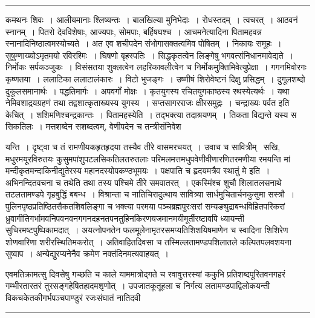 \documentclass[11pt, openany]{book}
\begin{document}
\vspace{2mm}
\hrule

\noindent
{\s कमथनः शिवः~। आलीयमानाः श्लिष्यन्तः~। बालखिल्या मुनिभेदाः~। रोधस्तदम्~। त्वचरत्~। आठवनं स्नानम्~। पितरो देवविशेषाः, आज्यपाः, सोमपाः, बर्हिषघश्च~। आचमनेत्यादिना पितामहवन्न स्नानादिनिष्ठात्वमस्योच्यते~। अत एव शचीपदेन संभोगासक्तत्वमिव पोषितम्~। निकायः समूहः~। सुषुम्णाख्योऽमृतमयो रविरश्मिः~। घिषणो बृहस्पतिः~। सिद्धकृतत्वेन लिङ्गेषु भगवत्संनिधानमावेद्यते~। निर्मोकः सर्पकञ्जुकः~। विसंसतया शुक्लत्वेन लहरिकावलीत्वेन च निर्मोकमुक्तिमिवेत्युप्रेक्षा~। गगनमिवोरगः कृष्णतया~। ललाटिका ललाटालंकारः~। विटो भुजङ्गः~। उष्णीषं शिरोवेष्टनं दिक्षु प्रसिद्धम्~। दुगूलशब्दो दुकूलसमानार्थः~। पद्धतिमार्गः~। अपवर्गों मोक्षः~। कृतयुगस्य रचितयुगकाष्ठस्य रथस्येत्यर्थः~। यथा नेमिवशाद्रयग्रहणं तथा तद्वशात्कृताख्यस्य युगस्य~। सप्तसागरराजः क्षीरसमुद्रः~। चन्द्राख्यः पर्वत इति केचित्~। शशिमणिश्चन्द्रकान्तः~। पितामहस्येति~। तद्भक्त्या तदाश्रयणम्~। तिकता विद्यन्ते यस्य स सिकतिलः~। मत्तशब्देन सशब्दत्वम्, वेणीपदेन च तन्त्रीसंनिवेश\textendash}

\newpage

\noindent
यन्ति~। दृष्ट्वा च तं रामणीयकहृतहृदया तस्यैव तीरे वासमरचयत्~। उवाच च सावित्रीम् \textendash\ {\haq सखि, मधुरमयूरविरुतयः कुसुमपांशुपटलसिकतिलतरुतलाः परिमलमत्तमधुपवेणीवीणारणितरमणीया रमयन्ति मां मन्दीकृतमन्दाकिनीद्युतेरस्य महानदस्योपकण्ठभूमयः~। पक्षपाति च हृदयमत्रैव स्थातुं मे} इति~। अभिनन्दितवचना च तथेति तथा तस्य पश्चिमे तीरे समवातरत्~। एकस्मिंश्च शुचौ शिलातलसनाथे तटलतामण्डपे गृहबुद्धिं बबन्ध~। विश्रान्ता च नातिचिरादुत्थाय सावित्र्या सार्धमुचितार्चनकुसुमा सस्त्रौ~। पुलिनपृष्ठप्रतिष्ठितसैकतशिवलिङ्गा च भक्त्या परमया पञ्चब्रह्मपुरःसरां सम्यङ्युद्राबन्धविहितपरिकरां ध्रुवागीतिगर्भामवनिपवनवनगगनदहनतपनतुहिनकिरणयजमानमयीमूर्तीरष्टावपि ध्यायन्ती सुचिरमष्टपुष्पिकामदात्~। अयत्नोपनतेन फलमूलेनामृतरसमप्यतिशिशयिषमाणेन च स्वादिना शिशिरेण शोणवारिणा शरीरस्थितिमकरोत्~। अतिवाहितदिवसा च तस्मिल्लतामण्डपशिलातले कल्पितपलवशयना सुष्वाप~। अन्येद्युरप्यनेनैव क्रमेण नक्त॑दिनमत्यवाहयत्~।

एवमतिक्रामत्सु दिवसेषु गच्छति च काले याममात्रोद्गते च रवावुत्तरस्यां ककुभि प्रतिशब्दपूरितवनगहरं गम्भीरतारतरं तुरसङ्गहेषितहादमशृणोत्~। उपजातकूतूहला च निर्गत्य लतामण्डपाद्विलोकयन्ती विकचकेतकीगर्भपञ्चपाण्डुरं रजःसंघातं नातिदवी\textendash

\vspace{2mm}
\hrule
\end{document}
